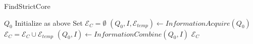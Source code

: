 \documentclass[11pt,reqno]{amsart}
\theoremstyle{definition}
\numberwithin{equation}{section}
\newcommand{\acto}{Q_0}
\newcommand{\coll}{I}
\newcommand{\fixfind}{\mathcal{E}_C}
\newcommand{\fixtemp}{\mathcal{E}_{temp}}
\begin{document}
\begin{algorithm} 
\caption{FindStrictCore} 
\label{alg:main}
\begin{algorithmic}[1]
\REQUIRE $\acto$
    \STATE Initialize as above
    \STATE Set $\fixfind = \emptyset$
    \WHILE{$\acto \not = \emptyset$} \label{alg3:while1}
        \STATE $(\acto, \coll, \fixtemp) \leftarrow InformationAcquire(\acto)$ 
        \STATE $\fixfind = \fixfind \cup \fixtemp$
        \WHILE{$\coll \not = \emptyset$} \label{alg3:while2}
            \STATE $(\acto,\coll) \leftarrow InformationCombine(\acto,\coll)$ 
        \ENDWHILE
    \ENDWHILE
\RETURN $\fixfind$
\end{algorithmic}
\end{algorithm}

\end{document}
